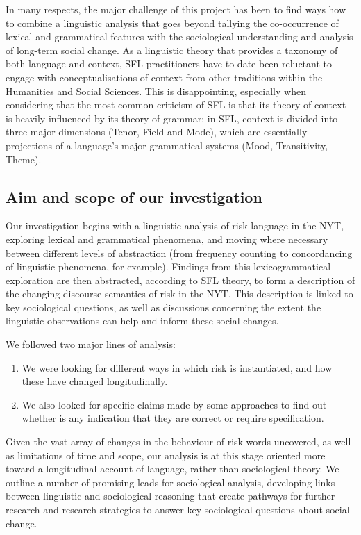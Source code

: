 In many respects, the major challenge of this project has been to find ways how to combine a linguistic analysis that goes beyond tallying the co-occurrence of lexical and grammatical features with the sociological understanding and analysis of long-term social change. As a linguistic theory that provides a taxonomy of both language and context, SFL practitioners have to date been reluctant to engage with conceptualisations of context from other traditions within the Humanities and Social Sciences. This is disappointing, especially when considering that the most common criticism of SFL is that its theory of context is heavily influenced by its theory of grammar: in SFL, context is divided into three major dimensions (Tenor, Field and Mode), which are essentially projections of a language's major grammatical systems (Mood, Transitivity, Theme).


\subsection{Aim and scope of our investigation}

Our investigation begins with a linguistic analysis of risk language in the NYT, exploring lexical and grammatical phenomena, and moving where necessary between different levels of abstraction (from frequency counting to concordancing of linguistic phenomena, for example). Findings from this lexicogrammatical exploration are then abstracted, according to SFL theory, to form a description of the changing discourse-semantics of risk in the NYT. This description is linked to key sociological questions, as well as discussions concerning the extent the linguistic observations can help and inform these social changes. 

We followed two major lines of analysis:

\begin{enumerate}
\item We were looking for different ways in which risk is instantiated, and how these have changed longitudinally.
\item We also looked for specific claims made by some approaches to find out whether is any indication that they are correct or require specification. 
\end{enumerate}
%
Given the vast array of changes in the behaviour of risk words uncovered, as well as limitations of time and scope, our analysis is at this stage oriented more toward a longitudinal account of language, rather than sociological theory. We outline a number of promising leads for sociological analysis, developing links between linguistic and sociological reasoning that create pathways for further research and research strategies to answer key sociological questions about social change.

